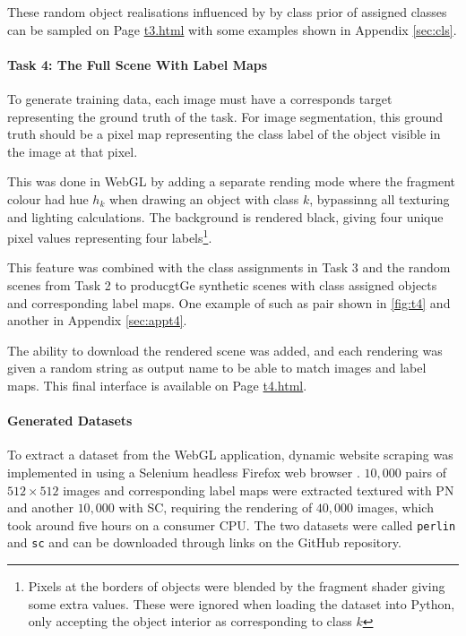 \documentclass[12pt,fleqn]{article}
\begin{document}
These random object realisations influenced by by class prior of assigned classes can be sampled on Page \href{https://www.student.dtu.dk/~s183911/proj/webgl-site/t3.html}{t3.html} with some examples shown in Appendix \ref{sec:cls}.


\paragraph{Task 4: The Full Scene With Label Maps}
To generate training data, each image must have a corresponds target representing the ground truth of the task.
For image segmentation, this ground truth should be a pixel map representing the class label of the object visible in the image at that pixel.

This was done in WebGL by adding a separate rending mode where the fragment colour had hue $h_k$ when drawing an object with class $k$, bypassinng all texturing and lighting calculations.
The background is rendered black, giving four unique pixel values representing four labels\footnote{Pixels at the borders of objects were blended by the fragment shader giving some extra values. These were ignored when loading the dataset into Python, only accepting the object interior as corresponding to class $k$}.

This feature was combined with the class assignments in Task 3 and the random scenes from Task 2 to producgtGe synthetic scenes with class assigned objects and corresponding label maps.
One example of such as pair shown in \ref{fig:t4} and another in Appendix \ref{sec:appt4}.

The ability to download the rendered scene was added, and each rendering was given a random string as output name to be able to match images and label maps.
This final interface is available on Page \href{https://www.student.dtu.dk/~s183911/proj/webgl-site/t4.html}{t4.html}.

\paragraph{Generated Datasets}
To extract a dataset from the WebGL application, dynamic website scraping was implemented in  using a Selenium headless Firefox web browser \cite{selenium2022docs}.
$10,000$ pairs of $512\times 512$ images and corresponding label maps were extracted textured with PN and another $10,000$ with SC, requiring the rendering of $40,000$ images, which took around five hours on a consumer CPU.
The two datasets were called \texttt{perlin} and \texttt{sc} and can be downloaded through links on the GitHub repository.
\end{document}
